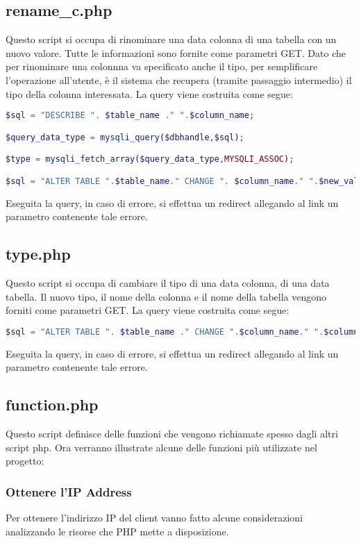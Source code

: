 \subsection{rename\_c.php}
Questo script si occupa di rinominare una data colonna di una tabella con un nuovo valore. Tutte le informazioni sono fornite come parametri GET. \newline
Dato che per rinominare una colonnna va specificato anche il tipo, per semplificare l'operazione all'utente, è il sistema che recupera (tramite passaggio intermedio) il tipo della colonna interessata.
La query viene costruita come segue:
\begin{lstlisting}[language=PHP]
$sql = "DESCRIBE ". $table_name ." ".$column_name;

$query_data_type = mysqli_query($dbhandle,$sql);

$type = mysqli_fetch_array($query_data_type,MYSQLI_ASSOC);

$sql = "ALTER TABLE ".$table_name." CHANGE ". $column_name." ".$new_value." ".$type["Type"];
\end{lstlisting}
Eseguita la query, in caso di errore, si effettua un redirect allegando al link un parametro contenente tale errore.

\subsection{type.php}
Questo script si occupa di cambiare il tipo di una data colonna, di una data tabella. Il nuovo tipo, il nome della colonna e il nome della tabella vengono forniti come parametri GET. \newline
La query viene costruita come segue:
\begin{lstlisting}[language=PHP]
$sql = "ALTER TABLE ". $table_name ." CHANGE ".$column_name." ".$column_name." ".$new_value; 
\end{lstlisting}
Eseguita la query, in caso di errore, si effettua un redirect allegando al link un parametro contenente tale errore.

\subsection{function.php}
Questo script definisce delle funzioni che vengono richiamate spesso dagli altri script php. \newline
Ora verranno illustrate alcune delle funzioni più utilizzate nel progetto:
\subsubsection{Ottenere l'IP Address}
Per ottenere l'indirizzo IP del client vanno fatto alcune considerazioni analizzando le risorse che PHP mette a disposizione. \newline

